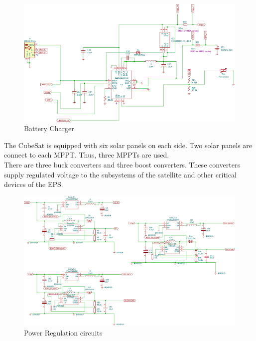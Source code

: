    \begin{figure}[H]
 	\centering
 	\includegraphics[width=0.99\columnwidth]{FrontMatter/pcb-Battery Charger.pdf}
 	\caption{\centering Battery Charger}
 	\label{fig:batt 4lr}
 \end{figure}
The CubeSat is equipped with six solar panels on each side. Two solar panels are connect to each MPPT. Thus, three MPPTs are used. \\There are three buck converters and three boost converters. These converters supply regulated voltage to the subsystems of the satellite and other critical devices of the EPS.
  \begin{figure}[!ht]
 	\centering
 	\includegraphics[width=\columnwidth]{FrontMatter/pcb-Regulation Module.pdf}
 	\caption{\centering Power Regulation circuits}
 	\label{fig:reg 4lr}
 \end{figure}

